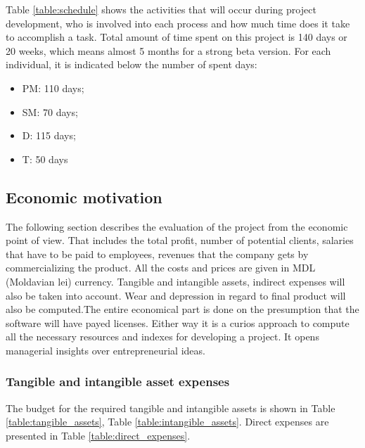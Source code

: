 \newpage
Table \ref{table:schedule} shows the activities that will occur during project development, who is involved into each process and how much time does it take to accomplish a task. Total amount of time spent on this project is 140 days or 20 weeks, which means almost 5 months for a strong beta version.
For each individual, it is indicated below the number
of spent days:
 \begin{itemize}
 \item PM: 110 days;
 \item SM: 70 days;
 \item D: 115 days;
 \item T: 50 days
\end{itemize}

\subsection{Economic motivation}
The following section describes the evaluation of the project from the economic point of view. That includes the total profit, number of potential clients, salaries that have to be paid to employees, revenues that the company gets by commercializing the product. All the costs and prices are given in MDL (Moldavian lei) currency. Tangible and intangible assets, indirect expenses will also be taken into account. Wear and depression in regard to final product will also be computed.The entire economical part is done on the presumption that the software will have payed licenses. Either way it is a curios approach to compute all the necessary resources and indexes for developing a project. It opens managerial insights over entrepreneurial ideas.


\subsubsection{Tangible and intangible asset expenses}
The budget for the required tangible and intangible assets is shown in Table \ref{table:tangible_assets}, Table \ref{table:intangible_assets}. Direct expenses are presented in Table \ref{table:direct_expenses}.

